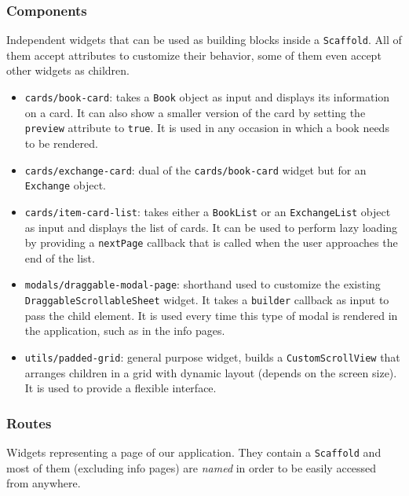 \subsubsection{Components}
Independent widgets that can be used as building blocks inside a \texttt{Scaffold}.
All of them accept attributes to customize their behavior, some of them even accept other widgets as children.

\begin{itemize}
    \item \texttt{cards/book-card}:
          takes a \texttt{Book} object as input and displays its information on a card.
          It can also show a smaller version of the card by setting the \texttt{preview} attribute to \texttt{true}.
          It is used in any occasion in which a book needs to be rendered.
    \item \texttt{cards/exchange-card}:
          dual of the \texttt{cards/book-card} widget but for an \texttt{Exchange} object.
    \item \texttt{cards/item-card-list}:
          takes either a \texttt{BookList} or an \texttt{ExchangeList} object as input and displays the list of cards.
          It can be used to perform lazy loading by providing a \texttt{nextPage} callback that is called when the user
          approaches the end of the list.
    \item \texttt{modals/draggable-modal-page}:
          shorthand used to customize the existing \texttt{DraggableScrollableSheet} widget.
          It takes a \texttt{builder} callback as input to pass the child element.
          It is used every time this type of modal is rendered in the application, such as in the info pages.
    \item \texttt{utils/padded-grid}:
          general purpose widget, builds a \texttt{CustomScrollView} that arranges children in a grid with
          dynamic layout (depends on the screen size). It is used to provide a flexible interface.
\end{itemize}

\subsubsection{Routes}
Widgets representing a page of our application.
They contain a \texttt{Scaffold} and most of them (excluding info pages) are \emph{named} in order to be easily accessed from anywhere.

